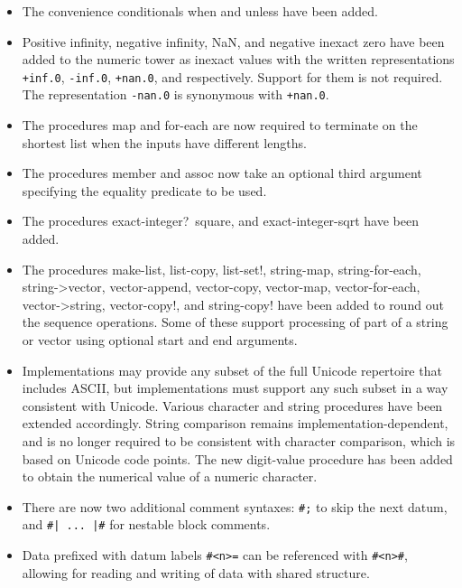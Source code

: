 \begin{itemize}
\item The convenience conditionals {\cf when} and {\cf unless} have been added.

\item Positive infinity, negative infinity, NaN, and negative inexact zero have been added
to the numeric tower as inexact values with the written
representations {\tt +inf.0}, {\tt -inf.0}, {\tt +nan.0}, and {}
respectively.  Support for them is not required.
The representation {\tt -nan.0} is synonymous with {\tt +nan.0}.

\item The procedures {\cf map} and {\cf for-each} are now required to terminate on
the shortest list when the inputs have different lengths.

\item The procedures {\cf member} and {\cf assoc} now take an optional third argument
specifying the equality predicate to be used.

\item The procedures {\cf exact-integer?}\, {\cf square},
and {\cf exact-integer-sqrt} have been added.

\item The procedures {\cf make-list}, {\cf list-copy}, {\cf list-set!},
{\cf string-map}, {\cf string-for-each}, {\cf string->vector}, 
{\cf vector-append},
{\cf vector-copy}, {\cf vector-map}, {\cf vector-for-each}, 
{\cf vector->string}, {\cf vector-copy!}, and {\cf string-copy!}
have been added to round out the sequence operations.
Some of these support processing of part of a string or vector using
optional start and end arguments.

\item Implementations may provide any subset of the full Unicode
repertoire that includes ASCII, but implementations must support any
such subset in a way consistent with Unicode.
Various character and string procedures have been extended accordingly.
String comparison remains implementation-dependent, and is no longer
required to be consistent with character comparison, which is based
on Unicode code points.
The new {\cf digit-value} procedure has been added to obtain the numerical
value of a numeric character.

\item There are now two additional comment syntaxes: {\tt \#;} to
skip the next datum, and {\tt \#| ... |\#}
for nestable block comments.

\item Data prefixed with datum labels {\tt \#<n>=} can be referenced
with {\tt \#<n>\#}, allowing for reading and writing of data with
shared structure.


\end{itemize}
